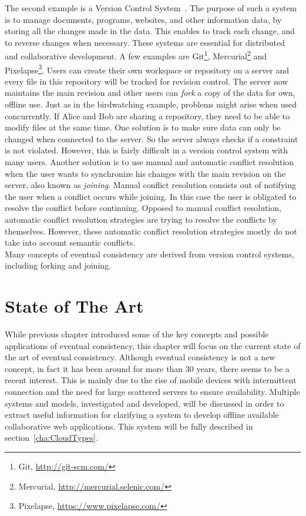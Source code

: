 \documentclass[a4paper,12pt]{report}
\begin{document}
The second example is a Version Control System~\cite{VCS}. The purpose of such a system is to manage documents, programs, websites, and other information data, by storing all the changes made in the data. This enables to track each change, and to reverse changes when necessary. These systems are essential for distributed and collaborative development. A few examples are Git\footnote{Git, \url{http://git-scm.com/}}, Mercurial\footnote{Mercurial, \url{http://mercurial.selenic.com/}} and Pixelapse\footnote{Pixelapse, \url{https://www.pixelapse.com/}}. Users can create their own workspace or repository on a server and every file in this repository will be tracked for revision control. The server now maintains the main revision and other users can \textit{fork} a copy of the data for own, offline use. Just as in the birdwatching example, problems might arise when used concurrently. If Alice and Bob are sharing a repository, they need to be able to modify files at the same time. One solution is to make sure data can only be changed when connected to the server. So the server always checks if a constraint is not violated. However, this is fairly difficult in a version control system with many users. Another solution is to use manual and automatic conflict resolution when the user wants to synchronize his changes with the main revision on the server, also known as \textit{joining}. Manual conflict resolution consists out of notifying the user when a conflict occurs while joining. In this case the user is obligated to resolve the conflict before continuing. Opposed to manual conflict resolution, automatic conflict resolution strategies are trying to resolve the conflicts by themselves. However, these automatic conflict resolution strategies mostly do not take into account semantic conflicts. \\
Many concepts of eventual consistency are derived from version control systems, including forking and joining.

\chapter{State of The Art}\label{cha:StateOfTheArt} %

While previous chapter introduced some of the key concepts and possible applications of eventual consistency, this chapter will focus on the current state of the art of eventual consistency. Although eventual consistency is not a new concept, in fact it has been around for more than 30 years, there seems to be a recent interest. This is mainly due to the rise of mobile devices with intermittent connection and the need for large scattered servers to ensure availability. Multiple systems and models, investigated and developed, will be discussed in order to extract useful information for clarifying a system to develop offline available collaborative web applications. This system will be fully described in section~\ref{cha:CloudTypes}. 
\end{document}
